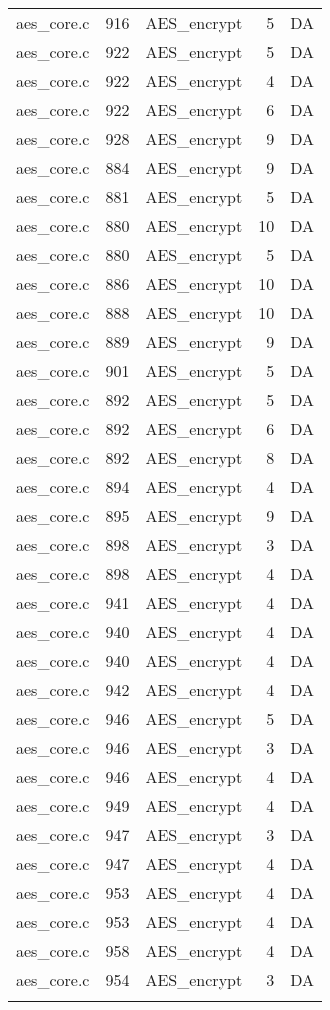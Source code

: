 \begin{table}[h]
{\begin{tabular}{clrrr}
aes\_core.c&916&AES\_encrypt&5 &DA\\
aes\_core.c&922&AES\_encrypt&5 &DA\\
aes\_core.c&922&AES\_encrypt&4 &DA\\
aes\_core.c&922&AES\_encrypt&6 &DA\\
aes\_core.c&928&AES\_encrypt&9 &DA\\
aes\_core.c&884&AES\_encrypt&9 &DA\\
aes\_core.c&881&AES\_encrypt&5 &DA\\
aes\_core.c&880&AES\_encrypt&10&DA\\
aes\_core.c&880&AES\_encrypt&5 &DA\\
aes\_core.c&886&AES\_encrypt&10&DA\\
aes\_core.c&888&AES\_encrypt&10&DA\\
aes\_core.c&889&AES\_encrypt&9 &DA\\
aes\_core.c&901&AES\_encrypt&5 &DA\\
aes\_core.c&892&AES\_encrypt&5 &DA\\
aes\_core.c&892&AES\_encrypt&6 &DA\\
aes\_core.c&892&AES\_encrypt&8 &DA\\
aes\_core.c&894&AES\_encrypt&4 &DA\\
aes\_core.c&895&AES\_encrypt&9 &DA\\
aes\_core.c&898&AES\_encrypt&3 &DA\\
aes\_core.c&898&AES\_encrypt&4 &DA\\
aes\_core.c&941&AES\_encrypt&4 &DA\\
aes\_core.c&940&AES\_encrypt&4 &DA\\
aes\_core.c&940&AES\_encrypt&4 &DA\\
aes\_core.c&942&AES\_encrypt&4 &DA\\
aes\_core.c&946&AES\_encrypt&5 &DA\\
aes\_core.c&946&AES\_encrypt&3 &DA\\
aes\_core.c&946&AES\_encrypt&4 &DA\\
aes\_core.c&949&AES\_encrypt&4 &DA\\
aes\_core.c&947&AES\_encrypt&3 &DA\\
aes\_core.c&947&AES\_encrypt&4 &DA\\
aes\_core.c&953&AES\_encrypt&4 &DA\\
aes\_core.c&953&AES\_encrypt&4 &DA\\
aes\_core.c&958&AES\_encrypt&4 &DA\\
aes\_core.c&954&AES\_encrypt&3 &DA\\
&&&&\\
\hline
\end{tabular}
}
\end{table}